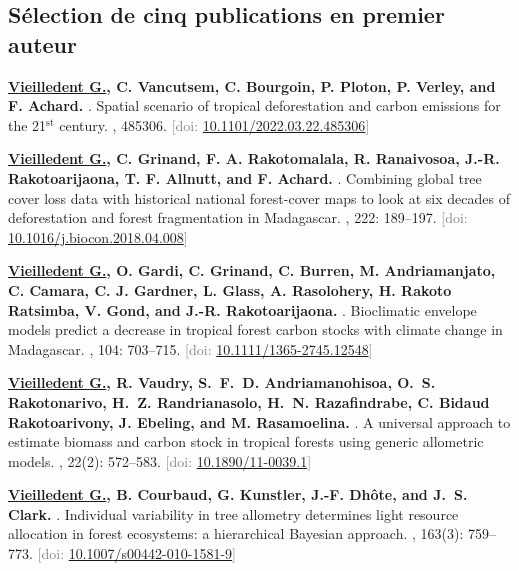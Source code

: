 \documentclass[10pt,a4paper,sans]{moderncv}
\newcounter{enumiv_gv}
\newcommand\doi[1]{[doi: \href{https://doi.org/#1}{#1}]}
\begin{document}

\vspace{0.3cm}
\subsection{Sélection de cinq publications en premier auteur}

\begin{thebibliography}{5}

\setcounter{enumiv}{4}
\textbf{\underline{Vieilledent G.}, C. Vancutsem, C. Bourgoin, P. Ploton, P. Verley, and F. Achard.} 
.
\newblock Spatial scenario of tropical deforestation and carbon emissions for the 21$^{\text{st}}$ century.
, 485306.
\newblock \textcolor{gray}{\doi{10.1101/2022.03.22.485306}}

\setcounter{enumiv}{3}
\textbf{\underline{Vieilledent G.}, C. Grinand, F. A. Rakotomalala, R. Ranaivosoa, J.-R. Rakotoarijaona, T. F. Allnutt, and F. Achard.} 
.
\newblock Combining global tree cover loss data with historical national forest-cover maps to look at six decades of deforestation and forest fragmentation in Madagascar.
, 222: 189--197.
\newblock \textcolor{gray}{\doi{10.1016/j.biocon.2018.04.008}}

\setcounter{enumiv}{2}
\textbf{\underline{Vieilledent G.}, O. Gardi, C. Grinand, C. Burren, M. Andriamanjato, C. Camara, C. J. Gardner, L. Glass, A. Rasolohery, H. Rakoto Ratsimba, V. Gond, and J.-R. Rakotoarijaona.} 
.
\newblock Bioclimatic envelope models predict a decrease in tropical forest carbon stocks with climate change in Madagascar.
, 104: 703--715.
\newblock \textcolor{gray}{\doi{10.1111/1365-2745.12548}}

\setcounter{enumiv}{1}
\textbf{\underline{Vieilledent G.}, R. Vaudry, S.~F.~D. Andriamanohisoa, O.~S. Rakotonarivo, H.~Z.
  Randrianasolo, H.~N. Razafindrabe, C. Bidaud Rakotoarivony, J. Ebeling, and M. Rasamoelina.}
.
\newblock A universal approach to estimate biomass and carbon stock in tropical
  forests using generic allometric models.
, 22(2): 572--583.
\newblock \textcolor{gray}{\doi{10.1890/11-0039.1}}

\setcounter{enumiv}{0}
\textbf{\underline{Vieilledent G.}, B. Courbaud, G. Kunstler, J.-F. Dhôte, and J.~S. Clark.}
.
\newblock Individual variability in tree allometry determines light resource
  allocation in forest ecosystems: a hierarchical Bayesian approach.
, 163(3): 759--773.
\newblock \textcolor{gray}{\doi{10.1007/s00442-010-1581-9}}

\end{thebibliography}
\end{document}
